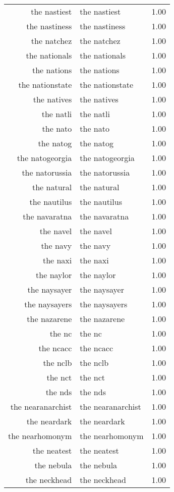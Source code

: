 \begin{table}[ht]
\begin{tabular}{rlr}
  the nastiest & the nastiest & 1.00 \\ 
  the nastiness & the nastiness & 1.00 \\ 
  the natchez & the natchez & 1.00 \\ 
  the nationals & the nationals & 1.00 \\ 
  the nations & the nations & 1.00 \\ 
  the nationstate & the nationstate & 1.00 \\ 
  the natives & the natives & 1.00 \\ 
  the natli & the natli & 1.00 \\ 
  the nato & the nato & 1.00 \\ 
  the natog & the natog & 1.00 \\ 
  the natogeorgia & the natogeorgia & 1.00 \\ 
  the natorussia & the natorussia & 1.00 \\ 
  the natural & the natural & 1.00 \\ 
  the nautilus & the nautilus & 1.00 \\ 
  the navaratna & the navaratna & 1.00 \\ 
  the navel & the navel & 1.00 \\ 
  the navy & the navy & 1.00 \\ 
  the naxi & the naxi & 1.00 \\ 
  the naylor & the naylor & 1.00 \\ 
  the naysayer & the naysayer & 1.00 \\ 
  the naysayers & the naysayers & 1.00 \\ 
  the nazarene & the nazarene & 1.00 \\ 
  the nc & the nc & 1.00 \\ 
  the ncacc & the ncacc & 1.00 \\ 
  the nclb & the nclb & 1.00 \\ 
  the nct & the nct & 1.00 \\ 
  the nds & the nds & 1.00 \\ 
  the nearanarchist & the nearanarchist & 1.00 \\ 
  the neardark & the neardark & 1.00 \\ 
  the nearhomonym & the nearhomonym & 1.00 \\ 
  the neatest & the neatest & 1.00 \\ 
  the nebula & the nebula & 1.00 \\ 
  the neckhead & the neckhead & 1.00 \\ 

\end{tabular}
\end{table}
